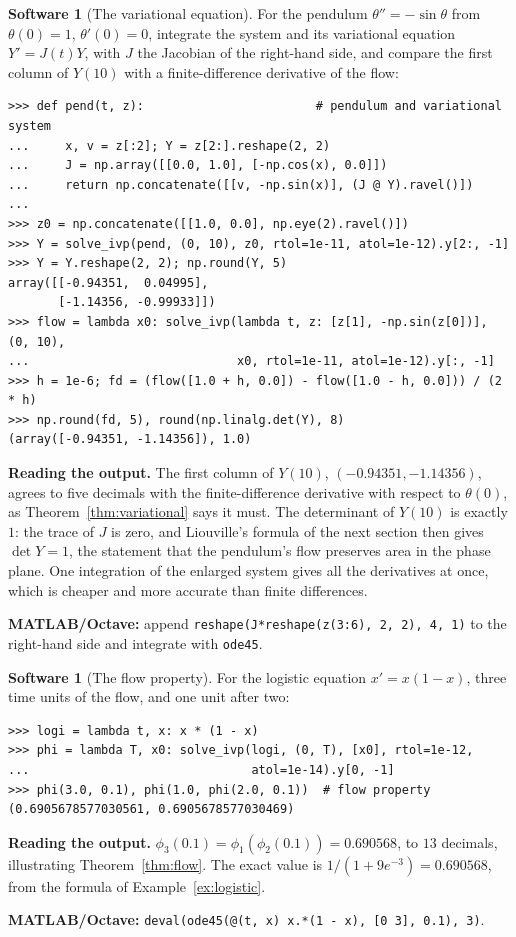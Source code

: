 \documentclass[11pt,a4paper]{article}
\numberwithin{equation}{section}
\theoremstyle{definition}
\newtheorem{software}[thm]{Software}
\begin{document}
\begin{software}[The variational equation]
\label{sw:variational}
For the pendulum $\theta'' = -\sin\theta$ from $\theta(0) = 1$, $\theta'(0) = 0$, integrate the system and its variational equation $Y' = J(t)Y$, with $J$ the Jacobian of the right-hand side, and
compare the first column of $Y(10)$ with a finite-difference derivative of the flow:
{\small\begin{verbatim}
>>> def pend(t, z):                        # pendulum and variational system
...     x, v = z[:2]; Y = z[2:].reshape(2, 2)
...     J = np.array([[0.0, 1.0], [-np.cos(x), 0.0]])
...     return np.concatenate([[v, -np.sin(x)], (J @ Y).ravel()])
...
>>> z0 = np.concatenate([[1.0, 0.0], np.eye(2).ravel()])
>>> Y = solve_ivp(pend, (0, 10), z0, rtol=1e-11, atol=1e-12).y[2:, -1]
>>> Y = Y.reshape(2, 2); np.round(Y, 5)
array([[-0.94351,  0.04995],
       [-1.14356, -0.99933]])
>>> flow = lambda x0: solve_ivp(lambda t, z: [z[1], -np.sin(z[0])], (0, 10),
...                             x0, rtol=1e-11, atol=1e-12).y[:, -1]
>>> h = 1e-6; fd = (flow([1.0 + h, 0.0]) - flow([1.0 - h, 0.0])) / (2 * h)
>>> np.round(fd, 5), round(np.linalg.det(Y), 8)
(array([-0.94351, -1.14356]), 1.0)
\end{verbatim}}
\textbf{Reading the output.} The first column of $Y(10)$, $(-0.94351, -1.14356)$, agrees to five decimals with the finite-difference derivative with respect to $\theta(0)$, as Theorem~\ref{thm:variational}
says it must. The determinant of $Y(10)$ is exactly $1$: the trace of $J$ is zero, and Liouville's formula of the next section then gives $\det Y = 1$, the statement that the pendulum's flow preserves
area in the phase plane. One integration of the enlarged system gives all the derivatives at once, which is cheaper and more accurate than finite differences.

\textbf{MATLAB/Octave:} append \texttt{reshape(J*reshape(z(3:6), 2, 2), 4, 1)} to the right-hand side and integrate with \texttt{ode45}.
\end{software}

\begin{software}[The flow property]
\label{sw:flow}
For the logistic equation $x' = x(1 - x)$, three time units of the flow, and one unit after two:
{\small\begin{verbatim}
>>> logi = lambda t, x: x * (1 - x)
>>> phi = lambda T, x0: solve_ivp(logi, (0, T), [x0], rtol=1e-12,
...                               atol=1e-14).y[0, -1]
>>> phi(3.0, 0.1), phi(1.0, phi(2.0, 0.1))  # flow property
(0.6905678577030561, 0.6905678577030469)
\end{verbatim}}
\textbf{Reading the output.} $\phi_3(0.1) = \phi_1(\phi_2(0.1)) = 0.690568$, to $13$ decimals, illustrating Theorem~\ref{thm:flow}. The exact value is $1/(1 + 9e^{-3}) = 0.690568$, from the formula of Example~\ref{ex:logistic}.

\textbf{MATLAB/Octave:} \texttt{deval(ode45(@(t, x) x.*(1 - x), [0 3], 0.1), 3)}.
\end{software}
\end{document}
